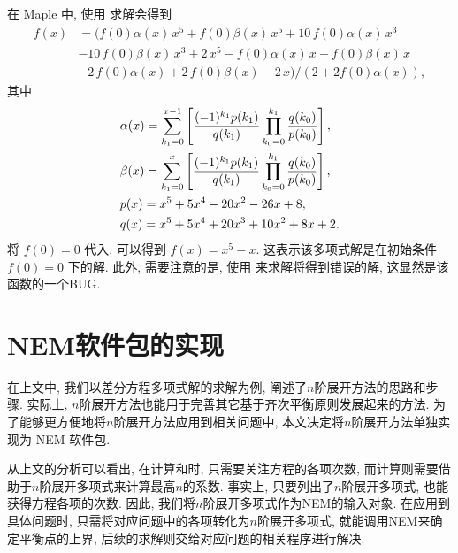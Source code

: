\begin{example}
在 Maple 中, 使用  求解会得到
\begin{equation}
\begin{aligned}
    f(x)&=(f \left( 0 \right) \alpha(x)\,{x}^{5}+f \left( 0 \right) \beta(x)\,{x}^{5}+10\,f \left( 0 \right) \alpha(x)\,{x}^{3}\\
    &-10\,f \left( 0 \right) \beta(x)\,{x}^{3}+2\,{x}^{5}-f \left( 0 \right) \alpha(x)\,x-f \left( 0 \right) \beta(x)\,x\\
    &-2\,f \left( 0 \right) \alpha(x)+2\,f \left( 0 \right) \beta(x)-2\,x)/(2+2f(0)\alpha(x)) ,
\end{aligned} \label{rasol_real}
\end{equation}
其中
\begin{equation}
\begin{aligned}
&\alpha(x)=\sum_{k_1=0}^{x-1}\left[
    \frac{(-1)^{k_1}p(k_1)}{q(k_1)}\prod_{k_0=0}^{k_1}{
        \frac{q(k_0)}{p(k_0)}
    }
\right], \\
&\beta(x)=\sum_{k_1=0}^{x}\left[
    \frac{(-1)^{k_1}p(k_1)}{q(k_1)}\prod_{k_0=0}^{k_1}{
        \frac{q(k_0)}{p(k_0)}
    }
\right], \\
&p(x)=x^5+5x^4-20x^2-26x+8, \\
&q(x)=x^5+5x^4+20x^3+10x^2+8x+2. 
\end{aligned}
\end{equation}
将 $f(0)=0$ 代入, 可以得到 $f(x)=x^5-x$. 这表示该多项式解是在初始条件 $f(0)=0$ 下的解. 此外, 需要注意的是, 使用  来求解将得到错误的解, 这显然是该函数的一个BUG. 
\end{example}

\section{NEM软件包的实现}\label{ch4sec3}
在上文中, 我们以差分方程多项式解的求解为例, 阐述了$n$阶展开方法的思路和步骤. 实际上, $n$阶展开方法也能用于完善其它基于齐次平衡原则发展起来的方法. 为了能够更方便地将$n$阶展开方法应用到相关问题中, 本文决定将$n$阶展开方法单独实现为 NEM 软件包.

从上文的分析可以看出, 在计算\BPone{}和\BPtwo{}时, 只需要关注方程的各项次数, 而计算\BPthree{}则需要借助于$n$阶展开多项式来计算最高$n$的系数. 事实上, 只要列出了$n$阶展开多项式, 也能获得方程各项的次数. 因此, 我们将$n$阶展开多项式作为NEM的输入对象. 在应用到具体问题时, 只需将对应问题中的各项转化为$n$阶展开多项式, 就能调用NEM来确定平衡点的上界, 后续的求解则交给对应问题的相关程序进行解决. 

